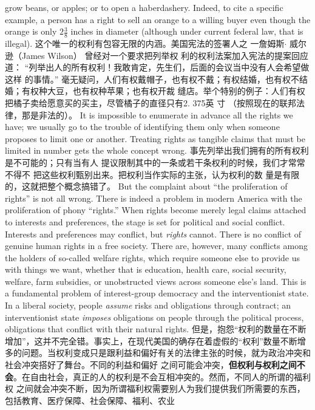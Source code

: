\begin{paracol}{2}
grow beans, or apples; or to open a haberdashery. Indeed, to
cite a specific example, a person has a right to sell an orange to
a willing buyer even though the orange is only $2\frac{3}{8}$ inches in diameter (although under current federal law, that is illegal).
\switchcolumn
这个唯一的权利有包容无限的内涵。美国宪法的签署人之
一詹姆斯$\cdot$ 威尔逊（James Wilson） 曾经对一个要求把列举权
利的权利法案加入宪法的提案回应道： “列举出人的所有权利！我敢肯定，先生们，后面的会议当中没有人会希望做这样
的事情。” 毫无疑问，人们有权戴帽子，也有权不戴；有权结婚，也有权不结婚；有权种大豆，也有权种苹果；也有权开裁
缝店。举个特别的例子：人们有权把橘子卖给愿意买的买主，尽管橘子的直径只有2. 375英 寸 （按照现在的联邦法律，那是非法的）。
\switchcolumn*
It is impossible to enumerate in advance all the rights we
have; we usually go to the trouble of identifying them only
when someone proposes to limit one or another. Treating rights
as tangible claims that must be limited in number gets the
whole concept wrong.
\switchcolumn
事先列举出我们拥有的所有权利是不可能的；只有当有人
提议限制其中的一条或若干条权利的时候，我们才常常不得不
把这些权利甄别出来。把权利当作实际的主张，认为权利的数
量是有限的，这就把整个概念搞错了。
\switchcolumn*
But the complaint about ``the proliferation of rights'' is not
all wrong. There is indeed a problem in modern America with
the proliferation of phony ``rights.'' When rights become
merely legal claims attached to interests and preferences, the
stage is set for political and social conflict. Interests and preferences may conflict, but \textit{rights} cannot. There is no conflict of
genuine human rights in a free society. There are, however,
many conflicts among the holders of so-called welfare rights,
which require someone else to provide us with things we want,
whether that is education, health care, social security, welfare,
farm subsidies, or unobstructed views across someone else's
land. This is a fundamental problem of interest-group democracy and the interventionist state. In a liberal society, people \textit{assume} risks and obligations through contract; an interventionist
state \textit{imposes} obligations on people through the political process,
obligations that conflict with their natural rights.
\switchcolumn
但是，抱怨“权利的数量在不断增加”，这并不完全错。事实上，在现代美国的确存在着虚假的“权利”数量不断增
多的问题。当权利变成只是跟利益和偏好有关的法律主张的时候，就为政治冲突和社会冲突搭好了舞台。不同的利益和偏好
之间可能会冲突，\textbf{但权利与权利之间不会}。在自由社会，真正的人的权利是不会互相冲突的。然而，不同人的所谓的福利权
之间就会冲突不断，因为所谓福利权需要别人为我们提供我们所需要的东西，包括教育、医疗保障、社会保障、福利、农业

\end{paracol}
